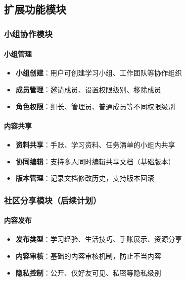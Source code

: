 \documentclass[a4paper]{article}
\begin{document}
\subsection{扩展功能模块}

\subsubsection{小组协作模块}

\paragraph{小组管理}
\begin{itemize}
    \item \textbf{小组创建}：用户可创建学习小组、工作团队等协作组织
    \item \textbf{成员管理}：邀请成员、设置权限级别、移除成员
    \item \textbf{角色权限}：组长、管理员、普通成员等不同权限级别
\end{itemize}

\paragraph{内容共享}
\begin{itemize}
    \item \textbf{资料共享}：手账、学习资料、任务清单的小组内共享
    \item \textbf{协同编辑}：支持多人同时编辑共享文档（基础版本）
    \item \textbf{版本管理}：记录文档修改历史，支持版本回滚
\end{itemize}

\subsubsection{社区分享模块（后续计划）}

\paragraph{内容发布}
\begin{itemize}
    \item \textbf{发布类型}：学习经验、生活技巧、手账展示、资源分享
    \item \textbf{内容审核}：基础的内容审核机制，防止不当内容
    \item \textbf{隐私控制}：公开、仅好友可见、私密等隐私级别
\end{itemize}
\end{document}

